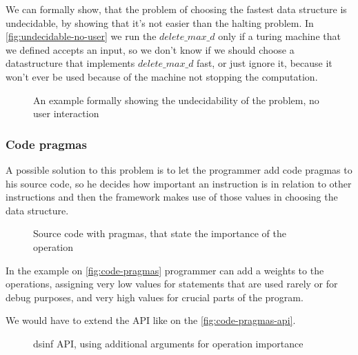 \documentclass[a4paper,11pt]{article}
\begin{document}
        We can formally show, that the problem of choosing the fastest data structure is undecidable, by showing that
        it's not easier than the halting problem. In \autoref{fig:undecidable-no-user} we run the $delete\_max\_d$ only
        if a turing machine that we defined accepts an input, so we don't know if we should choose a datastructure that
        implements $delete\_max\_d$ fast, or just ignore it, because it won't ever be used because of the machine not
        stopping the computation.

        \begin{figure}
			

			\caption{An example formally showing the undecidability of the problem, no user interaction}

			\label{fig:undecidable-no-user}
		\end{figure}

		\subsubsection{Code pragmas} \label{sec:pragmas}

			A possible solution to this problem is to let the programmer add code pragmas to his source
			code, so he decides how important an instruction is in relation to other instructions and then
			the framework makes use of those values in choosing the data structure.

            \begin{figure}[!h]
				

				\caption{Source code with pragmas, that state the importance of the operation}

				\label{fig:code-pragmas}
			\end{figure}

            In the example on \autoref{fig:code-pragmas} programmer can add a weights to the operations, assigning very low values
			for statements that are used rarely or for debug purposes, and very high values for crucial
			parts of the program.

            We would have to extend the API like on the \autoref{fig:code-pragmas-api}.

            \begin{figure}[!h]
				

				\caption{dsinf API, using additional arguments for operation importance}

				\label{fig:code-pragmas-api}
			\end{figure}
\end{document}

